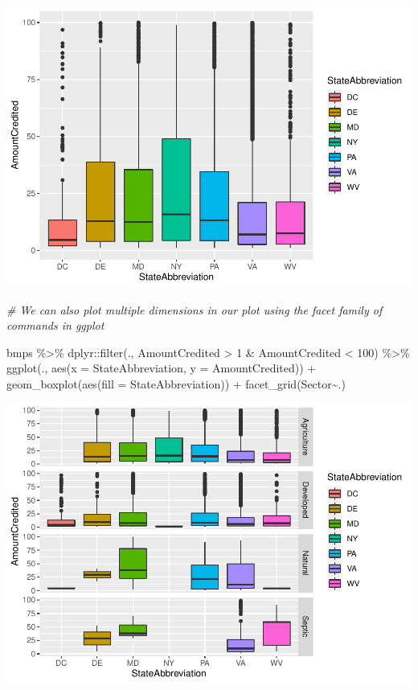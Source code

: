 \documentclass[]{article}
\newenvironment{Shaded}{\begin{snugshade}}{\end{snugshade}}
\newcommand{\AttributeTok}[1]{\textcolor[rgb]{0.77,0.63,0.00}{#1}}
\newcommand{\CommentTok}[1]{\textcolor[rgb]{0.56,0.35,0.01}{\textit{#1}}}
\newcommand{\DecValTok}[1]{\textcolor[rgb]{0.00,0.00,0.81}{#1}}
\newcommand{\FunctionTok}[1]{\textcolor[rgb]{0.00,0.00,0.00}{#1}}
\newcommand{\NormalTok}[1]{#1}
\newcommand{\SpecialCharTok}[1]{\textcolor[rgb]{0.00,0.00,0.00}{#1}}
\begin{document}
\includegraphics{lab02_files/figure-latex/review3-2.pdf}

\begin{Shaded}
\begin{Highlighting}[]
\CommentTok{\# We can also plot multiple dimensions in our plot using the \textasciigrave{}facet\textasciigrave{} family of commands in ggplot}

\NormalTok{bmps }\SpecialCharTok{\%\textgreater{}\%} 
\NormalTok{  dplyr}\SpecialCharTok{::}\FunctionTok{filter}\NormalTok{(., AmountCredited }\SpecialCharTok{\textgreater{}} \DecValTok{1} \SpecialCharTok{\&}\NormalTok{ AmountCredited }\SpecialCharTok{\textless{}} \DecValTok{100}\NormalTok{) }\SpecialCharTok{\%\textgreater{}\%} 
  \FunctionTok{ggplot}\NormalTok{(., }\FunctionTok{aes}\NormalTok{(}\AttributeTok{x =}\NormalTok{ StateAbbreviation, }\AttributeTok{y =}\NormalTok{ AmountCredited)) }\SpecialCharTok{+}
  \FunctionTok{geom\_boxplot}\NormalTok{(}\FunctionTok{aes}\NormalTok{(}\AttributeTok{fill =}\NormalTok{ StateAbbreviation)) }\SpecialCharTok{+}
  \FunctionTok{facet\_grid}\NormalTok{(Sector}\SpecialCharTok{\textasciitilde{}}\NormalTok{.)}
\end{Highlighting}
\end{Shaded}

\includegraphics{lab02_files/figure-latex/review3-3.pdf}
\end{document}
